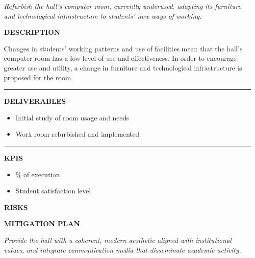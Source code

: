 \documentclass[11pt,a4paper]{scrreprt}
\newcommand{\fieldlabel}[1]{%
  {\footnotesize\sffamily\bfseries\color{mutedcolor}\MakeUppercase{#1}}\par\nopagebreak[4]
}
\newcommand{\fieldsep}{\vspace{3pt}\noindent\textcolor{bordercolor}{\rule{\linewidth}{0.4pt}}\vspace{3pt}\par}
\begin{document}
\newpage
{}
{\small\color{mutedcolor}\itshape Refurbish the hall's computer room, currently underused, adapting its furniture and technological infrastructure to students' new ways of working.}\par\vspace{6pt}

\begin{tcolorbox}[pabox={espcolor}{A.P.2.1 \enspace\textbullet\enspace Refurbishment of the Hall's Work Room}]

\fieldlabel{Description}
{\small Changes in students' working patterns and use of facilities mean that the hall's computer room has a low level of use and effectiveness. In order to encourage greater use and utility, a change in furniture and technological infrastructure is proposed for the room.}\par
\fieldsep
\fieldlabel{Deliverables}
{\small \begin{itemize}[noitemsep,topsep=2pt]
\item Initial study of room usage and needs
\item Work room refurbished and implemented
\end{itemize}}\par
\fieldsep
\fieldlabel{KPIs}
{\small \begin{itemize}[noitemsep,topsep=2pt]
\item \% of execution
\item Student satisfaction level
\end{itemize}}\par
\end{tcolorbox}
\begin{tcolorbox}[riskbox]
{\footnotesize\sffamily\bfseries\color{red!50!black} RISKS}\par{}
\end{tcolorbox}
\begin{tcolorbox}[mitbox]
{\footnotesize\sffamily\bfseries\color{green!40!black} MITIGATION PLAN}\par{}
\end{tcolorbox}
\vspace{8pt}

\newpage
{}
{\small\color{mutedcolor}\itshape Provide the hall with a coherent, modern aesthetic aligned with institutional values, and integrate communication media that disseminate academic activity.}\par\vspace{6pt}
\end{document}

